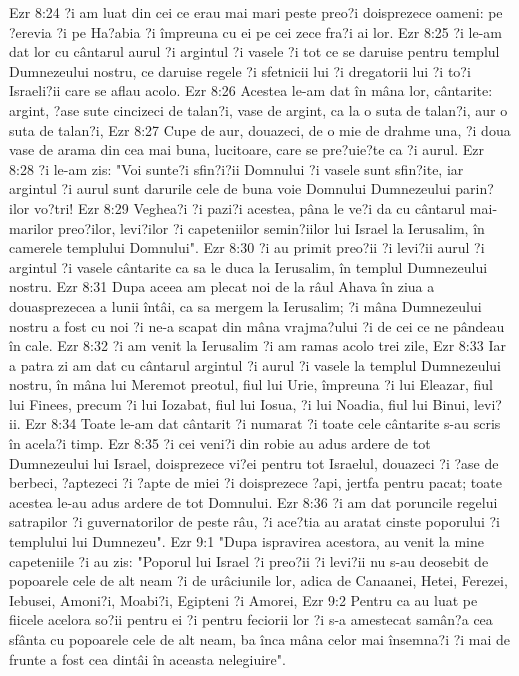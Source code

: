 Ezr 8:24  ?i am luat din cei ce erau mai mari peste preo?i doisprezece oameni: pe ?erevia ?i pe Ha?abia ?i împreuna cu ei pe cei zece fra?i ai lor.
Ezr 8:25  ?i le-am dat lor cu cântarul aurul ?i argintul ?i vasele ?i tot ce se daruise pentru templul Dumnezeului nostru, ce daruise regele ?i sfetnicii lui ?i dregatorii lui ?i to?i Israeli?ii care se aflau acolo.
Ezr 8:26  Acestea le-am dat în mâna lor, cântarite: argint, ?ase sute cincizeci de talan?i, vase de argint, ca la o suta de talan?i, aur o suta de talan?i,
Ezr 8:27  Cupe de aur, douazeci, de o mie de drahme una, ?i doua vase de arama din cea mai buna, lucitoare, care se pre?uie?te ca ?i aurul.
Ezr 8:28  ?i le-am zis: "Voi sunte?i sfin?i?ii Domnului ?i vasele sunt sfin?ite, iar argintul ?i aurul sunt darurile cele de buna voie Domnului Dumnezeului parin?ilor vo?tri!
Ezr 8:29  Veghea?i ?i pazi?i acestea, pâna le ve?i da cu cântarul mai-marilor preo?ilor, levi?ilor ?i capeteniilor semin?iilor lui Israel la Ierusalim, în camerele templului Domnului".
Ezr 8:30  ?i au primit preo?ii ?i levi?ii aurul ?i argintul ?i vasele cântarite ca sa le duca la Ierusalim, în templul Dumnezeului nostru.
Ezr 8:31  Dupa aceea am plecat noi de la râul Ahava în ziua a douasprezecea a lunii întâi, ca sa mergem la Ierusalim; ?i mâna Dumnezeului nostru a fost cu noi ?i ne-a scapat din mâna vrajma?ului ?i de cei ce ne pândeau în cale.
Ezr 8:32  ?i am venit la Ierusalim ?i am ramas acolo trei zile,
Ezr 8:33  Iar a patra zi am dat cu cântarul argintul ?i aurul ?i vasele la templul Dumnezeului nostru, în mâna lui Meremot preotul, fiul lui Urie, împreuna ?i lui Eleazar, fiul lui Finees, precum ?i lui Iozabat, fiul lui Iosua, ?i lui Noadia, fiul lui Binui, levi?ii.
Ezr 8:34  Toate le-am dat cântarit ?i numarat ?i toate cele cântarite s-au scris în acela?i timp.
Ezr 8:35  ?i cei veni?i din robie au adus ardere de tot Dumnezeului lui Israel, doisprezece vi?ei pentru tot Israelul, douazeci ?i ?ase de berbeci, ?aptezeci ?i ?apte de miei ?i doisprezece ?api, jertfa pentru pacat; toate acestea le-au adus ardere de tot Domnului.
Ezr 8:36  ?i am dat poruncile regelui satrapilor ?i guvernatorilor de peste râu, ?i ace?tia au aratat cinste poporului ?i templului lui Dumnezeu".
Ezr 9:1  "Dupa ispravirea acestora, au venit la mine capeteniile ?i au zis: "Poporul lui Israel ?i preo?ii ?i levi?ii nu s-au deosebit de popoarele cele de alt neam ?i de urâciunile lor, adica de Canaanei, Hetei, Ferezei, Iebusei, Amoni?i, Moabi?i, Egipteni ?i Amorei,
Ezr 9:2  Pentru ca au luat pe fiicele acelora so?ii pentru ei ?i pentru feciorii lor ?i s-a amestecat samân?a cea sfânta cu popoarele cele de alt neam, ba înca mâna celor mai însemna?i ?i mai de frunte a fost cea dintâi în aceasta nelegiuire".
